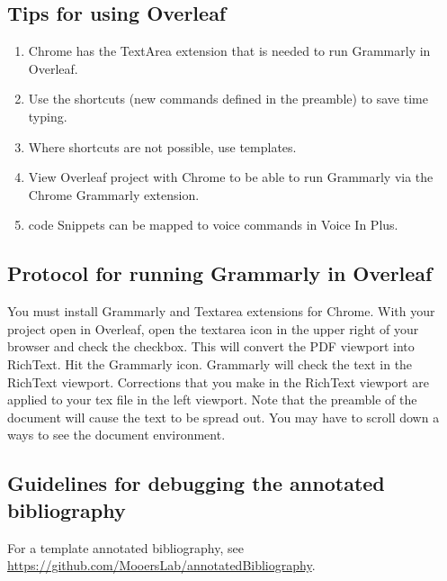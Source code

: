 \documentclass[11pt,letterpaper]{article}
\begin{document}
\subsection{Tips for using Overleaf}
\label{sec:orgfe2d630}

\begin{enumerate}
\item Chrome has the TextArea extension that is needed to run Grammarly in
Overleaf.
\item Use the shortcuts (new commands defined in the preamble) to save time
typing.
\item Where shortcuts are not possible, use templates.
\item View Overleaf project with Chrome to be able to run Grammarly via the
Chrome Grammarly extension.
\item code Snippets can be mapped to voice commands in Voice In Plus.
\end{enumerate}



\subsection{Protocol for running Grammarly in Overleaf}
\label{sec:org5512821}


You must install Grammarly and Textarea extensions for Chrome. With your
project open in Overleaf, open the textarea icon in the upper right of
your browser and check the checkbox. This will convert the PDF viewport
into RichText. Hit the Grammarly icon. Grammarly will check the text in
the RichText viewport. Corrections that you make in the RichText
viewport are applied to your tex file in the left viewport. Note that
the preamble of the document will cause the text to be spread out. You
may have to scroll down a ways to see the document environment.



\subsection{Guidelines for debugging the annotated bibliography}
\label{sec:org33da1bd}



For a template annotated bibliography, see
\url{https://github.com/MooersLab/annotatedBibliography}.
\end{document}
